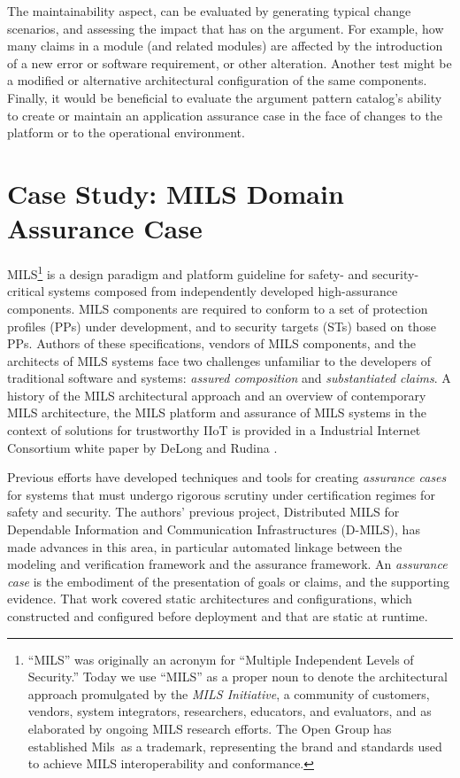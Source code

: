 \documentclass[12pt,twoside,a4paper]{article}
\begin{document}
The maintainability aspect, can be evaluated by generating typical change scenarios, and assessing the impact that has on the argument. For example, how many claims in a module (and related modules) are affected by the introduction of a new error or software requirement, or other alteration. Another test might be a modified or alternative architectural configuration of the same components. Finally, it would be beneficial to evaluate the argument pattern catalog's ability to create or maintain an application assurance case in the face of changes to the platform or to the operational environment. 

\newpage
\section{Case Study: MILS Domain Assurance Case}\label{sec:ac-structure}
MILS\footnote{ ``MILS'' was originally an acronym for ``Multiple
  Independent Levels of Security.''  Today we use ``MILS'' as a proper noun
  to denote the architectural approach promulgated by the \emph{MILS
    Initiative}, a community of customers, vendors, system integrators,
  researchers, educators, and evaluators, and as elaborated by ongoing MILS
  research efforts. The Open Group has established
  Mils\texttrademark~as a trademark, representing the brand and standards
  used to achieve MILS interoperability and conformance.} is a design paradigm and platform guideline for safety- and
security-critical systems composed from independently developed
high-assurance components.  MILS components are required to conform to a
set of protection profiles (PPs) under development, and to security targets
(STs) based on those PPs.  Authors of these specifications, vendors of MILS
components, and the architects of MILS systems face two challenges
unfamiliar to the developers of traditional software and systems:
\emph{assured composition} and \emph{substantiated claims}.
A history of the MILS architectural approach
and an overview of contemporary MILS architecture, the MILS platform and assurance of MILS systems in the context of solutions for trustworthy IIoT is provided in a Industrial Internet Consortium white paper by DeLong and Rudina
\cite{delong-rudina21mils-iiot}.

Previous efforts have developed techniques and tools for creating
\emph{assurance cases} for systems that must undergo rigorous scrutiny
under certification regimes for safety and security.  The authors' previous
project, Distributed MILS for Dependable Information and Communication
Infrastructures (D-MILS), has made advances in this area, in particular
automated linkage between the modeling and verification framework and the
assurance framework.  An \emph{assurance case} is the embodiment of the
presentation of goals or claims, and the supporting evidence.  That work
covered static architectures and configurations, which constructed and
configured before deployment and that are static at runtime.
\end{document}
